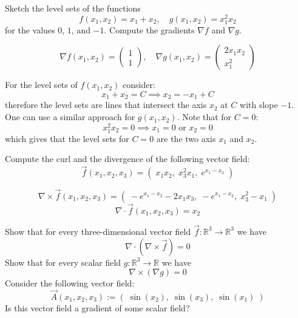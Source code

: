 \documentclass[11pt]{article}
\begin{document}

\begin{exercise}
	Sketch the level sets of the functions 
    \[
        f(x_1,x_2) = x_1 + x_2, \quad g(x_1,x_2) = x_1^2 x_2 
    \]
    for the values $0$, $1$, and $-1$.
    Compute the gradients $\nabla f$ and  $\nabla g$.
\end{exercise}

\begin{solution}
    \[
        \nabla f(x_1,x_2) = \begin{pmatrix} 1\\ 1 \end{pmatrix}, \quad \nabla g(x_1,x_2) =  \begin{pmatrix} 2x_1x_2\\ x_1^2 \end{pmatrix}
    \]


For the level sets of $f(x_1,x_2)$ consider:
    \[
        x_1 + x_2 = C \implies x_2 = -x_1 + C
    \]
therefore the level sets are lines that intersect the axis $x_2$ at $C$ with slope $-1$. One can use a similar approach for $g(x_1,x_2)$. Note that for $C =0$:
    \[
        x_1^2 x_2 = 0 \implies x_1 =0 \text{ or } x_2 = 0
    \]
which gives that the level sets for $C = 0$ are the two axis $x_1$ and $x_2$. 
\end{solution}


\begin{exercise}
	Compute the curl and the divergence of the following vector field:
    \[
        \vec{f}(x_1,x_2,x_3) = \left( \; x_1 x_2, \; x_3^2 x_1,\;  e^{x_1 - x_2} \; \right)
    \]
\end{exercise}

\begin{solution}
    \[
        \nabla \times \vec{f}(x_1,x_2,x_3) = \left( \; -e^{x_1-x_2} - 2x_1x_3, \; -e^{x_1-x_2},\;  x_3^2 - x_1 \; \right)
    \]
   \[
        \nabla \cdot \vec{f}(x_1,x_2,x_3) = x_2
    \]
\end{solution}





\begin{exercise}
	Show that for every three-dimensional vector field $\vec{f} \colon \mathbb{R}^3 \to \mathbb{R}^3$ we have 
    \[
        \nabla \cdot \left( \nabla \times \vec{f} \right) = 0
    \]
    Show that for every scalar field $g \colon \mathbb{R}^3 \to \mathbb{R}$ we have 
    \[
        \nabla \times \left( \nabla g \right) = 0
    \]
    Consider the following vector field:
    \[
        \vec{A}(x_1,x_2,x_3) := \left( \; \sin(x_2),  \; \sin(x_3), \; \sin(x_1) \; \right)
    \]
    Is this vector field a gradient of some scalar field?
\end{exercise}
\end{document}
